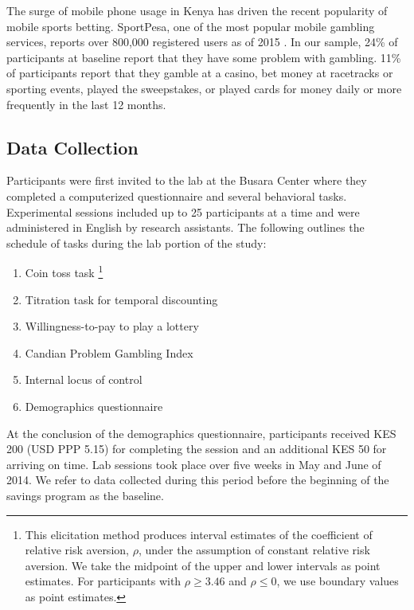 \documentclass[12pt]{article}
\begin{document}
		The surge of mobile phone usage in Kenya has driven the recent popularity of mobile sports betting. SportPesa, one of the most popular mobile gambling services, reports over 800,000 registered users as of 2015 \parencite{kemibaro_sportpesa_2015}. In our sample, 24\% of participants at baseline report that they have some problem with gambling. 11\% of participants report that they gamble at a casino, bet money at racetracks or sporting events, played the sweepstakes, or played cards for money daily or more frequently in the last 12 months.

	\subsection{Data Collection}

		Participants were first invited to the lab at the Busara Center where they completed a computerized questionnaire and several behavioral tasks. Experimental sessions included up to 25 participants at a time and were administered in English by research assistants. The following outlines the schedule of tasks during the lab portion of the study:

		\begin{enumerate} \setlength{\itemsep}{1pt}
		\item Coin toss task \parencite{eckel_sex_2002}\footnote{This elicitation method produces interval estimates of the coefficient of relative risk aversion, $\rho$, under the assumption of constant relative risk aversion. We take the midpoint of the upper and lower intervals as point estimates. For participants with $\rho \geq 3.46$ and $\rho \leq 0$, we use boundary values as point estimates.}
		\item Titration task for temporal discounting \parencite{cornsweet_staircase-method_1962}
		\item Willingness-to-pay to play a lottery
		\item Candian Problem Gambling Index \parencite{ferris_canadian_2001}
		\item Internal locus of control \parencite{rotter_generalized_1966}
		\item Demographics questionnaire
		\end{enumerate}

		At the conclusion of the demographics questionnaire, participants received KES 200 (USD PPP 5.15) for completing the session and an additional KES 50 for arriving on time. Lab sessions took place over five weeks in May and June of 2014. We refer to data collected during this period before the beginning of the savings program as the baseline.
\end{document}
